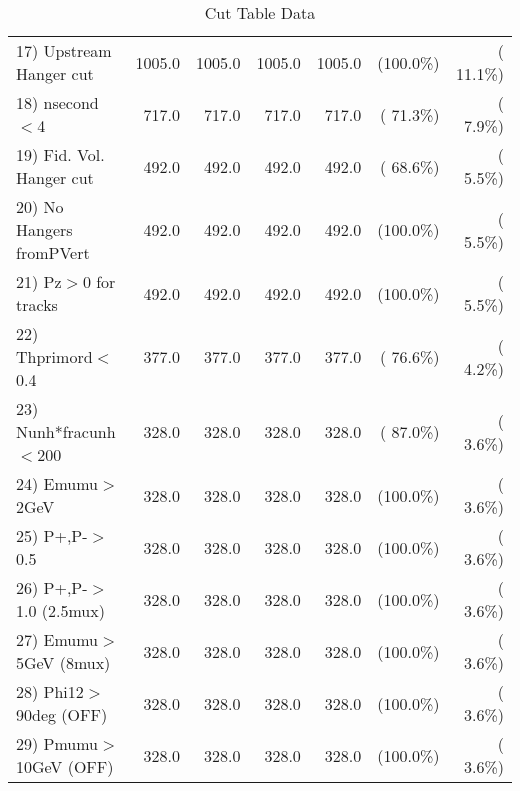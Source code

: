 \begin{table}[h!]
\begin{tabular}{||l||r|r|r|r|r|r||}
 17) Upstream Hanger cut  &       1005.0 &       1005.0 &       1005.0 &       1005.0 & (100.0\%) & ( 11.1\%) \\
 18) nsecond$<$4          &        717.0 &        717.0 &        717.0 &        717.0 & ( 71.3\%) & (  7.9\%) \\
 19) Fid. Vol. Hanger cut &        492.0 &        492.0 &        492.0 &        492.0 & ( 68.6\%) & (  5.5\%) \\
 20) No Hangers fromPVert &        492.0 &        492.0 &        492.0 &        492.0 & (100.0\%) & (  5.5\%) \\
 21) Pz$>$0 for tracks    &        492.0 &        492.0 &        492.0 &        492.0 & (100.0\%) & (  5.5\%) \\
 22) Thprimord$<$0.4      &        377.0 &        377.0 &        377.0 &        377.0 & ( 76.6\%) & (  4.2\%) \\
 23) Nunh*fracunh$<$200   &        328.0 &        328.0 &        328.0 &        328.0 & ( 87.0\%) & (  3.6\%) \\
 24) Emumu$>$2GeV         &        328.0 &        328.0 &        328.0 &        328.0 & (100.0\%) & (  3.6\%) \\
 25) P+,P-$>$0.5          &        328.0 &        328.0 &        328.0 &        328.0 & (100.0\%) & (  3.6\%) \\
 26) P+,P-$>$1.0 (2.5mux) &        328.0 &        328.0 &        328.0 &        328.0 & (100.0\%) & (  3.6\%) \\
 27) Emumu$>$5GeV  (8mux) &        328.0 &        328.0 &        328.0 &        328.0 & (100.0\%) & (  3.6\%) \\
 28) Phi12$>$90deg  (OFF) &        328.0 &        328.0 &        328.0 &        328.0 & (100.0\%) & (  3.6\%) \\
 29) Pmumu$>$10GeV  (OFF) &        328.0 &        328.0 &        328.0 &        328.0 & (100.0\%) & (  3.6\%) \\
 \hline
 \hline
 \end{tabular}
 \caption{Cut Table  Data     }
 \label{tab-cutcohjpsi-mumu_data}
 \end{table}
